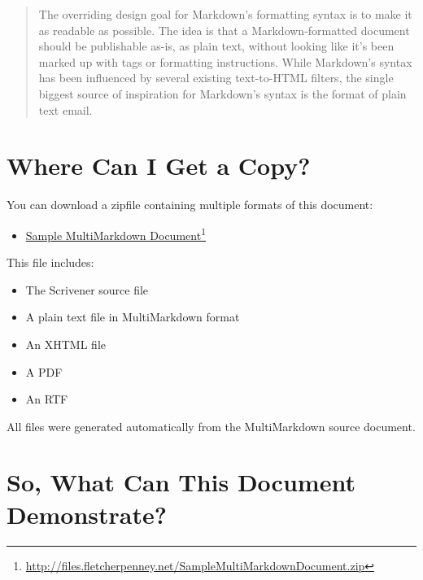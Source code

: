 \documentclass[oneside,article]{memoir}
\begin{document}
\begin{quotation}
The overriding design goal for Markdown's formatting syntax is to make it as
  readable as possible. The idea is that a Markdown-formatted document should be
  publishable as-is, as plain text, without looking like it's been marked up
  with tags or formatting instructions. While Markdown's syntax has been
  influenced by several existing text-to-HTML filters, the single biggest source
  of inspiration for Markdown's syntax is the format of plain text
  email.~\cite{Gruber}
\end{quotation}

\chapter{Where Can I Get a Copy?}
\label{wherecanigetacopy}

You can download a zipfile containing multiple formats of this document:


\begin{itemize}


\item \href{http://files.fletcherpenney.net/SampleMultiMarkdownDocument.zip}{Sample MultiMarkdown Document}\footnote{\href{http://files.fletcherpenney.net/SampleMultiMarkdownDocument.zip}{http://files.fletcherpenney.net/SampleMultiMarkdownDocument.zip}}
\end{itemize}

This file includes:


\begin{itemize}


\item The Scrivener source file

\item A plain text file in MultiMarkdown format

\item An XHTML file

\item A PDF

\item An RTF
\end{itemize}

All files were generated automatically from the MultiMarkdown source document.


\chapter{So, What Can This Document Demonstrate?}
\label{sowhatcanthisdocumentdemonstrate}
\end{document}
